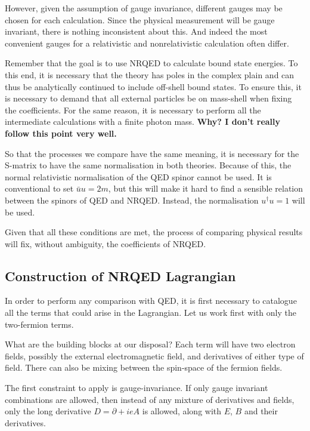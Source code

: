 However, given the assumption of gauge invariance, different gauges may be chosen for each calculation.  Since the physical measurement will be gauge invariant, there is nothing inconsistent about this.  And indeed the most convenient gauges for a relativistic and nonrelativistic calculation often differ.

Remember that the goal is to use NRQED to calculate bound state energies.  To this end, it is necessary that the theory has poles in the complex plain and can thus be analytically continued to include off-shell bound states.  To ensure this, it is necessary to demand that all external particles be on mass-shell when fixing the coefficients.  For the same reason, it is necessary to perform all the intermediate calculations with a finite photon mass.  {\bf Why? I don't really follow this point very well.}
 
So that the processes we compare have the same meaning, it is necessary for the S-matrix to have the same normalisation in both theories.  Because of this, the normal relativistic normalisation of the QED spinor cannot be used.  It is conventional to set $\bar{u} u = 2m$, but this will make it hard to find a sensible relation between the spinors of QED and NRQED.  Instead, the normalisation $u^\dagger u = 1$ will be used.

Given that all these conditions are met, the process of comparing physical results will fix, without ambiguity, the coefficients of NRQED.   

\subsection{Construction of NRQED Lagrangian}

In order to perform any comparison with QED, it is first necessary to catalogue all the terms that could arise in the Lagrangian.  Let us work first with only the two-fermion terms.

What are the building blocks at our disposal?  Each term will have two electron fields, possibly the external electromagnetic field, and derivatives of either type of field.  There can also be mixing between the spin-space of the fermion fields.

The first constraint to apply is gauge-invariance.  If only gauge invariant combinations are allowed, then instead of any mixture of derivatives and fields, only the long derivative $D = \partial + ieA$ is allowed, along with $E$, $B$ and their derivatives.


